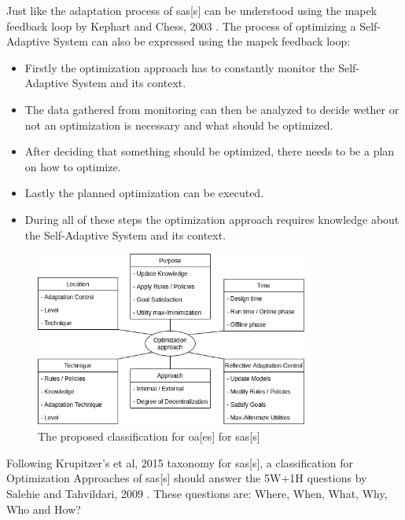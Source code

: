 \noindent Just like the adaptation process of \acrlong{sas}[s] can be understood using
the \acrshort{mapek} feedback loop by Kephart and Chess, 2003 \cite*{VisionOfAutonomicComputing}.
The process of optimizing a Self-Adaptive System can also be expressed using the \acrshort{mapek} feedback loop:
\begin{itemize}[nosep]
    \item Firstly the optimization approach has to constantly monitor the Self-Adaptive System and its context.
    \item The data gathered from monitoring can then be analyzed to decide wether or not an optimization is necessary and what should be optimized.
    \item After deciding that something should be optimized, there needs to be a plan on how to optimize.
    \item Lastly the planned optimization can be executed.
    \item During all of these steps the optimization approach requires knowledge about the Self-Adaptive System and its context.
\end{itemize}

\begin{figure}[h]
    \centering
    \includegraphics[width=0.8\textwidth]{images/ClassificationProposal-WithDimensions.png}
    \caption{The proposed classification for \acrlong{oa}[es] for \acrlong{sas}[s]}
    \label{fig:Proposal}
\end{figure}

\noindent Following Krupitzer's et al, 2015 \cite*{SurveyOnEngineeringApproaches} taxonomy for \acrlong{sas}[s],
a classification for Optimization Approaches of \acrlong{sas}[s] should answer 
the 5W+1H questions by Salehie and Tahvildari, 2009 \cite*{LandscapeAndResearchChallenges}.
These questions are: Where, When, What, Why, Who and How?


